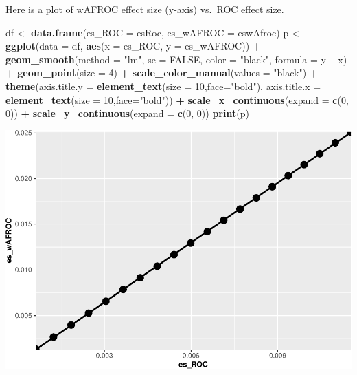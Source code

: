 \documentclass[]{book}
\newenvironment{Shaded}{\begin{snugshade}}{\end{snugshade}}
\newcommand{\DataTypeTok}[1]{\textcolor[rgb]{0.13,0.29,0.53}{#1}}
\newcommand{\DecValTok}[1]{\textcolor[rgb]{0.00,0.00,0.81}{#1}}
\newcommand{\KeywordTok}[1]{\textcolor[rgb]{0.13,0.29,0.53}{\textbf{#1}}}
\newcommand{\NormalTok}[1]{#1}
\newcommand{\OperatorTok}[1]{\textcolor[rgb]{0.81,0.36,0.00}{\textbf{#1}}}
\newcommand{\OtherTok}[1]{\textcolor[rgb]{0.56,0.35,0.01}{#1}}
\newcommand{\StringTok}[1]{\textcolor[rgb]{0.31,0.60,0.02}{#1}}
\begin{document}
Here is a plot of wAFROC effect size (y-axis) vs.~ROC effect size.

\begin{Shaded}
\begin{Highlighting}[]
\NormalTok{df <-}\StringTok{ }\KeywordTok{data.frame}\NormalTok{(}\DataTypeTok{es_ROC =}\NormalTok{ esRoc, }\DataTypeTok{es_wAFROC =}\NormalTok{ eswAfroc)}
\NormalTok{p <-}\StringTok{ }\KeywordTok{ggplot}\NormalTok{(}\DataTypeTok{data =}\NormalTok{ df, }\KeywordTok{aes}\NormalTok{(}\DataTypeTok{x =}\NormalTok{ es_ROC, }\DataTypeTok{y =}\NormalTok{ es_wAFROC)) }\OperatorTok{+}
\StringTok{  }\KeywordTok{geom_smooth}\NormalTok{(}\DataTypeTok{method =} \StringTok{"lm"}\NormalTok{, }\DataTypeTok{se =} \OtherTok{FALSE}\NormalTok{, }\DataTypeTok{color =} \StringTok{"black"}\NormalTok{, }\DataTypeTok{formula =}\NormalTok{ y }\OperatorTok{~}\StringTok{ }\NormalTok{x) }\OperatorTok{+}
\StringTok{  }\KeywordTok{geom_point}\NormalTok{(}\DataTypeTok{size =} \DecValTok{4}\NormalTok{) }\OperatorTok{+}
\StringTok{  }\KeywordTok{scale_color_manual}\NormalTok{(}\DataTypeTok{values =} \StringTok{"black"}\NormalTok{) }\OperatorTok{+}\StringTok{ }
\StringTok{  }\KeywordTok{theme}\NormalTok{(}\DataTypeTok{axis.title.y =} \KeywordTok{element_text}\NormalTok{(}\DataTypeTok{size =} \DecValTok{10}\NormalTok{,}\DataTypeTok{face=}\StringTok{"bold"}\NormalTok{),}
        \DataTypeTok{axis.title.x =} \KeywordTok{element_text}\NormalTok{(}\DataTypeTok{size =} \DecValTok{10}\NormalTok{,}\DataTypeTok{face=}\StringTok{"bold"}\NormalTok{)) }\OperatorTok{+}
\StringTok{  }\KeywordTok{scale_x_continuous}\NormalTok{(}\DataTypeTok{expand =} \KeywordTok{c}\NormalTok{(}\DecValTok{0}\NormalTok{, }\DecValTok{0}\NormalTok{)) }\OperatorTok{+}\StringTok{ }
\StringTok{  }\KeywordTok{scale_y_continuous}\NormalTok{(}\DataTypeTok{expand =} \KeywordTok{c}\NormalTok{(}\DecValTok{0}\NormalTok{, }\DecValTok{0}\NormalTok{)) }
\KeywordTok{print}\NormalTok{(p)}
\end{Highlighting}
\end{Shaded}

\begin{center}\includegraphics{17-FrocSampleSize1_files/figure-latex/unnamed-chunk-9-1} \end{center}
\end{document}
